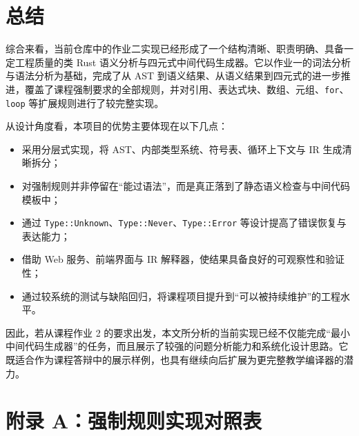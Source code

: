 \documentclass[UTF8,a4paper,12pt]{ctexart}
\newcommand{\pkg}[1]{\texttt{#1}}
\begin{document}
\section{总结}

综合来看，当前仓库中的作业二实现已经形成了一个结构清晰、职责明确、具备一定工程质量的类 Rust 语义分析与四元式中间代码生成器。它以作业一的词法分析与语法分析为基础，完成了从 AST 到语义结果、从语义结果到四元式的进一步推进，覆盖了课程强制要求的全部规则，并对引用、表达式块、数组、元组、\pkg{for}、\pkg{loop} 等扩展规则进行了较完整实现。

从设计角度看，本项目的优势主要体现在以下几点：

\begin{itemize}
    \item 采用分层式实现，将 AST、内部类型系统、符号表、循环上下文与 IR 生成清晰拆分；
    \item 对强制规则并非停留在“能过语法”，而是真正落到了静态语义检查与中间代码模板中；
    \item 通过 \pkg{Type::Unknown}、\pkg{Type::Never}、\pkg{Type::Error} 等设计提高了错误恢复与表达能力；
    \item 借助 Web 服务、前端界面与 IR 解释器，使结果具备良好的可观察性和验证性；
    \item 通过较系统的测试与缺陷回归，将课程项目提升到“可以被持续维护”的工程水平。
\end{itemize}

因此，若从课程作业 2 的要求出发，本文所分析的当前实现已经不仅能完成“最小中间代码生成器”的任务，而且展示了较强的问题分析能力和系统化设计思路。它既适合作为课程答辩中的展示样例，也具有继续向后扩展为更完整教学编译器的潜力。

\appendix

\section{附录 A：强制规则实现对照表}
\end{document}
